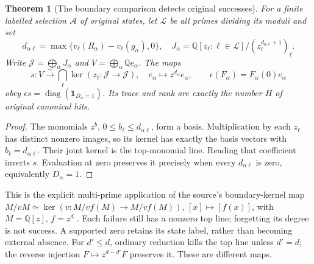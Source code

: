 \documentclass[10pt,a4paper]{article}
\newtheorem{theorem}{Theorem}
\begin{document}
\begin{theorem}[The boundary comparison detects original successes]
For a finite labelled selection $\mathscr A$ of original states, let $\mathcal L$
be all primes dividing its moduli and set
\[
 d_{\alpha\ell}=\max\{v_\ell(R_\alpha)-v_\ell(g_\alpha),0\},\quad
 J_\alpha=\mathbb Q[z_\ell:\ell\in\mathcal L]/(z_\ell^{d_{\alpha\ell}+1})_\ell.
\]
Write $\mathcal J=\bigoplus_\alpha J_\alpha$ and $V=\bigoplus_\alpha\mathbb Q e_\alpha$.
The maps
\[
 s:V\xrightarrow{\sim}\bigcap_\ell\ker(z_\ell:\mathcal J\to\mathcal J),\quad
 e_\alpha\mapsto z^{d_\alpha}e_\alpha,\qquad
 \epsilon(F_\alpha)=F_\alpha(0)e_\alpha
\]
obey $\epsilon s=\operatorname{diag}(\mathbf1_{D_\alpha=1})$.
Its trace and rank are exactly the number $H$ of original canonical hits.
\end{theorem}
\begin{proof}
The monomials $z^b$, $0\le b_\ell\le d_{\alpha\ell}$, form a basis.
Multiplication by each $z_\ell$ has distinct nonzero images, so its kernel
has exactly the basis vectors with $b_\ell=d_{\alpha\ell}$. Their joint
kernel is the top-monomial line. Reading that coefficient inverts $s$.
Evaluation at zero preserves it precisely when every $d_{\alpha\ell}$ is
zero, equivalently $D_\alpha=1$.
\end{proof}
This is the explicit multi-prime application of the source's boundary-kernel
map $M/vM\simeq\ker(v:M/vf(M)\to M/vf(M))$, $[x]\mapsto[f(x)]$,
with $M=\mathbb Q[z]$, $f=z^d$ \cite[BR1--BR7]{SZ}.
Each failure still has a nonzero top line; forgetting its degree is not success.
A supported zero retains its state label, rather than becoming external absence.
For $d'\le d$, ordinary reduction kills the top line unless $d'=d$;
the reverse injection $F\mapsto z^{d-d'}F$ preserves it. These are different maps.

\newpage
\end{document}
